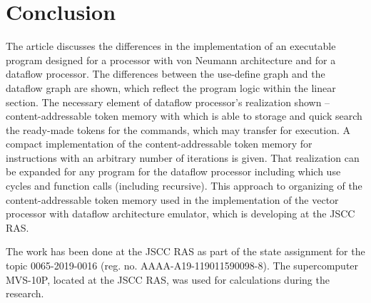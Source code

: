 \documentclass[
11pt,%
tightenlines,%
twoside,%
onecolumn,%
nofloats,%
nobibnotes,%
nofootinbib,%
superscriptaddress,%
noshowpacs,%
centertags]%
{revtex4}
\begin{document}
\section{Conclusion}

The article discusses the differences in the implementation of an executable program designed for a processor with von Neumann architecture and for a dataflow processor.
The differences between the use-define graph and the dataflow graph are shown, which reflect the program logic within the linear section.
The necessary element of dataflow processor’s realization shown -- content-addressable token memory with which is able to storage and quick search the ready-made tokens for the commands, which may transfer for execution.
A compact implementation of the content-addressable token memory for instructions with an arbitrary number of iterations is given.
That realization can be expanded for any program for the dataflow processor including which use cycles and function calls (including recursive).
This approach to organizing of the content-addressable token memory used in the implementation of the vector processor with dataflow architecture emulator, which is developing at the JSCC RAS.

\begin{acknowledgments}
The work has been done at the JSCC RAS as part of the state assignment for the topic 0065-2019-0016 (reg. no. AAAA-A19-119011590098-8).
The supercomputer MVS-10P, located at the JSCC RAS, was used for calculations during the research.
\end{acknowledgments}
\end{document}
